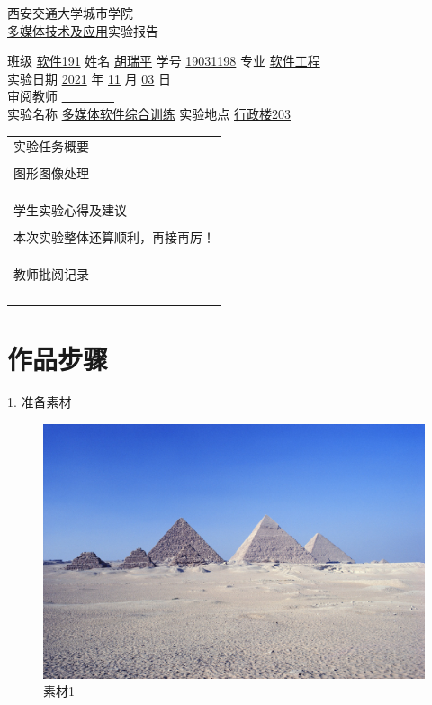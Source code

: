 \documentclass{report}
\begin{document}
\begin{center}
    \fontsize{30}{0}西安交通大学城市学院\\
\fontsize{20}{0}\underline{多媒体技术及应用}实验报告
\end{center}

\noindent
\LARGE 班级 \underline{软件191} 姓名 \underline{胡瑞平} 学号 \underline{19031198} 专业 \underline{软件工程}\\
\LARGE 实验日期 \underline{2021} 年 \underline{11} 月 \underline{03} 日\\
审阅教师 \underline{\,\,\,\,\,\,\,\,\,\,\,\,\,\,\,\,\,\,\,\,\,\,\,\,\,}\\
实验名称 \underline{多媒体软件综合训练} 实验地点 \underline{行政楼203}\\

\noindent
\begin{tabular}{|p{18cm}|}
    \hline
    实验任务概要\\
    \\图形图像处理
    \\
    \\
    \\
    \\
    \hline
    学生实验心得及建议\\
    \\本次实验整体还算顺利，再接再厉！
    \\
    \\
    \\
    \\
    \hline
    教师批阅记录\\
    \\
    \\
    \\
    \\
    \hline
\end{tabular}

\newpage

\section*{\Huge 作品步骤}

1. 准备素材

\begin{figure}[!htbp]
    \centering
    \includegraphics{2_1金字塔.jpg}
    \caption{素材1}
\end{figure}
\clearpage
\end{document}
